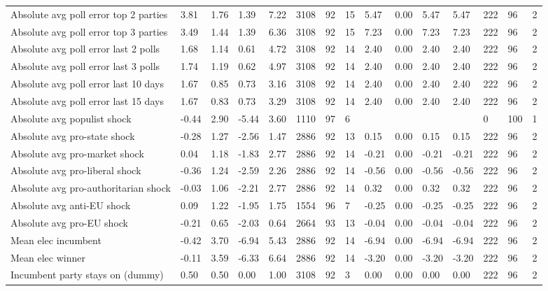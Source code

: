 \begin{longtable}{lllllllllllllll}
Absolute avg poll error top 2 parties & 3.81 & 1.76 & 1.39 & 7.22 & 3108 & 92 & 15 & 5.47 & 0.00 & 5.47 & 5.47 & 222 & 96 & 2\\
Absolute avg poll error top 3 parties & 3.49 & 1.44 & 1.39 & 6.36 & 3108 & 92 & 15 & 7.23 & 0.00 & 7.23 & 7.23 & 222 & 96 & 2\\
\addlinespace
Absolute avg poll error last 2 polls & 1.68 & 1.14 & 0.61 & 4.72 & 3108 & 92 & 14 & 2.40 & 0.00 & 2.40 & 2.40 & 222 & 96 & 2\\
Absolute avg poll error last 3 polls & 1.74 & 1.19 & 0.62 & 4.97 & 3108 & 92 & 14 & 2.40 & 0.00 & 2.40 & 2.40 & 222 & 96 & 2\\
Absolute avg poll error last 10 days & 1.67 & 0.85 & 0.73 & 3.16 & 3108 & 92 & 14 & 2.40 & 0.00 & 2.40 & 2.40 & 222 & 96 & 2\\
Absolute avg poll error last 15 days & 1.67 & 0.83 & 0.73 & 3.29 & 3108 & 92 & 14 & 2.40 & 0.00 & 2.40 & 2.40 & 222 & 96 & 2\\
Absolute avg populist shock & -0.44 & 2.90 & -5.44 & 3.60 & 1110 & 97 & 6 &  &  &  &  & 0 & 100 & 1\\
\addlinespace
Absolute avg pro-state shock & -0.28 & 1.27 & -2.56 & 1.47 & 2886 & 92 & 13 & 0.15 & 0.00 & 0.15 & 0.15 & 222 & 96 & 2\\
Absolute avg pro-market shock & 0.04 & 1.18 & -1.83 & 2.77 & 2886 & 92 & 14 & -0.21 & 0.00 & -0.21 & -0.21 & 222 & 96 & 2\\
Absolute avg pro-liberal shock & -0.36 & 1.24 & -2.59 & 2.26 & 2886 & 92 & 14 & -0.56 & 0.00 & -0.56 & -0.56 & 222 & 96 & 2\\
Absolute avg pro-authoritarian shock & -0.03 & 1.06 & -2.21 & 2.77 & 2886 & 92 & 14 & 0.32 & 0.00 & 0.32 & 0.32 & 222 & 96 & 2\\
Absolute avg anti-EU shock & 0.09 & 1.22 & -1.95 & 1.75 & 1554 & 96 & 7 & -0.25 & 0.00 & -0.25 & -0.25 & 222 & 96 & 2\\
\addlinespace
Absolute avg pro-EU shock & -0.21 & 0.65 & -2.03 & 0.64 & 2664 & 93 & 13 & -0.04 & 0.00 & -0.04 & -0.04 & 222 & 96 & 2\\
Mean elec incumbent & -0.42 & 3.70 & -6.94 & 5.43 & 2886 & 92 & 14 & -6.94 & 0.00 & -6.94 & -6.94 & 222 & 96 & 2\\
Mean elec winner & -0.11 & 3.59 & -6.33 & 6.64 & 2886 & 92 & 14 & -3.20 & 0.00 & -3.20 & -3.20 & 222 & 96 & 2\\
Incumbent party stays on (dummy) & 0.50 & 0.50 & 0.00 & 1.00 & 3108 & 92 & 3 & 0.00 & 0.00 & 0.00 & 0.00 & 222 & 96 & 2\\

\end{longtable}
